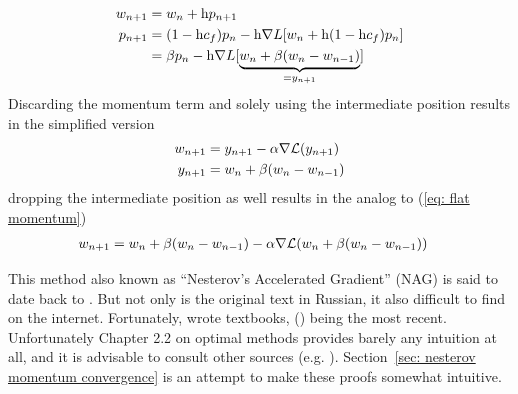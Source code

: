 %
\begin{definition}
	\label{def: nesterov's momentum}
	\begin{subequations}
	\begin{align}
		w_{n+1} &= w_n + \text{h} p_{n+1} \label{eq: nesterov momentum move}\\
		p_{n+1}
		&= (1-\text{h}c_f)p_n
		- \text{h}\nabla L[w_n + \text{h}(1-\text{h}c_f)p_n]
		\label{eq: nesterov momentum}
		\\ \nonumber
		&= \beta p_n
		- \text{h}\nabla L[\underbrace{
			w_n + \beta(w_n - w_{n-1})
		}_{= y_{n+1}}]
	\end{align}
	\end{subequations}
	Discarding the momentum term and solely using the intermediate position
	results in the simplified version
	\begin{subequations} \label{eq: nesterov intermediate position version}
	\begin{align}
		w_{n+1} &= y_{n+1} - \alpha \nabla \mathcal{L}(y_{n+1})\\
		y_{n+1}&= w_n + \beta(w_n - w_{n-1})
	\end{align}
	\end{subequations}
	dropping the intermediate position as well results in the analog to (\ref{eq:
	flat momentum})
	\begin{align}
		w_{n+1} &= w_n + \beta(w_n - w_{n-1})
		- \alpha \nabla \mathcal{L}(w_n + \beta(w_n - w_{n-1}))
	\end{align}
\end{definition}
%
\begin{remark}
	This method also known as ``Nesterov's Accelerated Gradient'' (NAG) is said
	to date back to \textcite{nesterovMethodSolvingConvex1983}.  But not only is
	the original text in Russian, it also difficult to find on the internet.
	Fortunately, \citeauthor{nesterovMethodSolvingConvex1983} wrote textbooks,
	(\citeyear{nesterovLecturesConvexOptimization2018}) being the most recent.
	Unfortunately Chapter 2.2 on optimal methods provides barely any
	intuition at all, and it is advisable to consult other sources (e.g.
	\textcite{dontlooWhatDifferenceMomentum2016}). Section~\ref{sec: nesterov
	momentum convergence} is an attempt to make these proofs somewhat intuitive.
 \end{remark}

